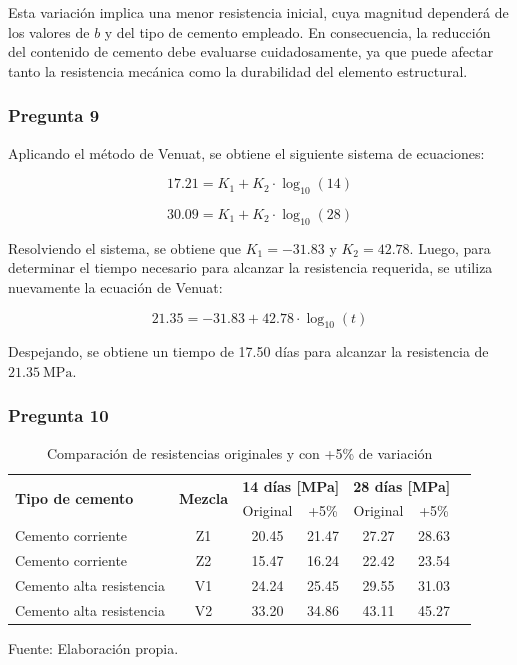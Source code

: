 Esta variación implica una menor resistencia inicial, cuya magnitud dependerá de los valores de \(b\) y del tipo de cemento empleado. En consecuencia, la reducción del contenido de cemento debe evaluarse cuidadosamente, ya que puede afectar tanto la resistencia mecánica como la durabilidad del elemento estructural.

\subsubsection*{Pregunta 9} 

Aplicando el método de Venuat, se obtiene el siguiente sistema de ecuaciones:

\begin{equation}
    17.21 = K_1 + K_2 \cdot \log_{10}(14)
\end{equation}

\begin{equation}
    30.09 = K_1 + K_2 \cdot \log_{10}(28)
\end{equation}

Resolviendo el sistema, se obtiene que \( K_1 = -31.83 \) y \( K_2 = 42.78 \).  
Luego, para determinar el tiempo necesario para alcanzar la resistencia requerida, se utiliza nuevamente la ecuación de Venuat:

\begin{equation}
    21.35 = -31.83 + 42.78 \cdot \log_{10}(t)
\end{equation}

Despejando, se obtiene un tiempo de 17.50 días para alcanzar la resistencia de \(21.35~\mathrm{MPa}\).


\subsubsection*{Pregunta 10} 

\begin{table}[H]
\centering
\renewcommand{\arraystretch}{1.20}
\caption{Comparación de resistencias originales y con +5\% de variación}
\small
\begin{tabular}{lcccccc}
\hline
\multirow{2}{*}{\textbf{Tipo de cemento}} & \multirow{2}{*}{\textbf{Mezcla}} & \multicolumn{2}{c}{\textbf{14 días [MPa]}} & \multicolumn{2}{c}{\textbf{28 días [MPa]}} \\
\cline{3-6}
 & & Original & +5\% & Original & +5\% \\
\hline
Cemento corriente & Z1 & 20.45 & 21.47 & 27.27 & 28.63 \\
Cemento corriente & Z2 & 15.47 & 16.24 & 22.42 & 23.54 \\
\hline
Cemento alta resistencia & V1 & 24.24 & 25.45 & 29.55 & 31.03 \\
Cemento alta resistencia & V2 & 33.20 & 34.86 & 43.11 & 45.27 \\
\hline
\end{tabular}
\begin{center}
Fuente: Elaboración propia.
\end{center}
\end{table}

